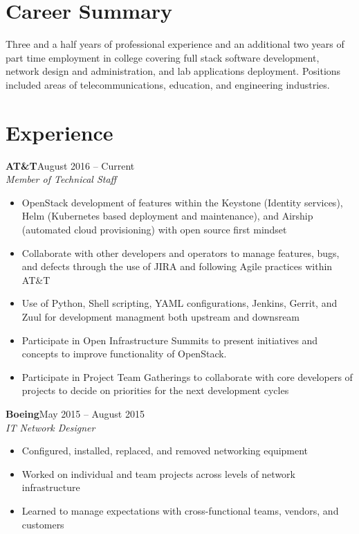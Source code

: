 \documentclass[margin]{res}
\begin{document}

\section{Career Summary} 
  Three and a half years of professional experience and an additional two years of part time employment in college covering full stack software development, network design and administration, and lab applications deployment. Positions included areas of telecommunications, education, and engineering industries. 

\section{Experience}
   \textbf{AT\&T}\hfill August 2016 -- Current\\
   \textit{Member of Technical Staff} 
   \begin{itemize} \itemsep -1pt  %
    \item OpenStack development of features within the Keystone (Identity services), Helm (Kubernetes based deployment and maintenance), and Airship (automated cloud provisioning) with open source first mindset
    \item Collaborate with other developers and operators to manage features, bugs, and defects through the use of JIRA and following Agile practices within AT\&T
    \item Use of Python, Shell scripting, YAML configurations, Jenkins, Gerrit, and Zuul for development managment both upstream and downsream
    \item Participate in Open Infrastructure Summits to present initiatives and concepts to improve functionality of OpenStack.
    \item Participate in Project Team Gatherings to collaborate with core developers of projects to decide on priorities for the next development cycles
   \end{itemize}

   \textbf{Boeing}\hfill May 2015 -- August 2015\\
   \textit{IT Network Designer}\hfill 
   \begin{itemize} \itemsep -1pt  %
     \item Configured, installed, replaced, and removed networking equipment
     \item Worked on individual and team projects across levels of network infrastructure
     \item Learned to manage expectations with cross-functional teams, vendors, and customers
   \end{itemize}
\end{document}
